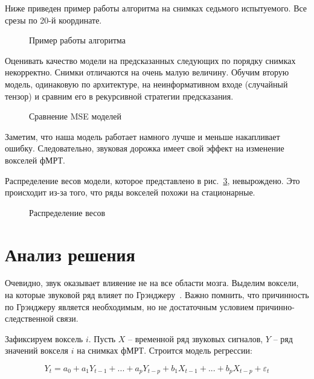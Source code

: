 \documentclass[12pt, twoside]{article}
\begin{document}
Ниже приведен пример работы алгоритма на снимках седьмого испытуемого. Все срезы по 20-й координате.

\begin{figure}[h!]
	\caption{Пример работы алгоритма}
	\label{fig:example}
\end{figure}

Оценивать качество модели на предсказанных следующих по порядку снимках некорректно. Снимки отличаются на очень малую величину. Обучим вторую модель, одинаковую по архитектуре, на неинформативном входе (случайный тензор) и сравним его в рекурсивной стратегии предсказания.

\begin{figure}[h!]
	\caption{Сравнение MSE моделей}
	\label{fig:example}
\end{figure}

Заметим, что наша модель работает намного лучше и меньше накапливает ошибку. Следовательно, звуковая дорожка имеет свой эффект на изменение вокселей фМРТ.

Распределение весов модели, которое представлено в рис.~\ref{fig:weights}, невырождено. Это происходит из-за того, что ряды вокселей похожи на стационарные.

\begin{figure}[h!]
	\caption{Распределение весов}
	\label{fig:weights}
\end{figure}

\section{Анализ решения}

Очевидно, звук оказывает влияение не на все области мозга. Выделим воксели, на которые звуковой ряд влияет по Грэнджеру~\citep{granger}. Важно помнить, что причинность по Грэнджеру является необходимым, но не достаточным условием причинно-следственной связи.

Зафиксируем воксель $i$. Пусть $X$ -- временной ряд звуковых сигналов, $Y$ -- ряд значений вокселя $i$ на снимках фМРТ. Строится модель регрессии:

\begin{equation}
	\label{eq10}
	Y_{t}=a_{0}+a_{1}Y_{t-1}+...+a_{p}Y_{t-p}+b_{1}X_{t-1}+...+b_{p}X_{t-p}+\varepsilon _{t}
\end{equation}
\end{document}
